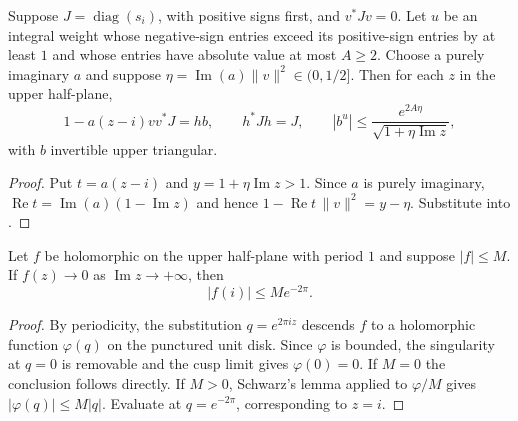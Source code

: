 \begin{lemma}
\label{lem:c-peak-triangular-upper}
\emitthmsource
Suppose $J=\operatorname{diag}(s_i)$, with positive signs first, and $v^*Jv=0$. Let $u$ be an integral weight whose negative-sign entries exceed its positive-sign entries by at least $1$ and whose entries have absolute value at most $A\ge2$. Choose a purely imaginary $a$ and suppose $\eta=\operatorname{Im}(a)\|v\|^2\in(0,1/2]$. Then for each $z$ in the upper half-plane,
\[
 1-a(z-i)v v^*J=hb,\qquad h^*Jh=J,\qquad
             |b^u|\le\frac{e^{2A\eta}}{\sqrt{1+\eta\operatorname{Im}z}},
\]
with $b$ invertible upper triangular.
\end{lemma}

\begin{proof}
Put $t=a(z-i)$ and $y=1+\eta\operatorname{Im}z>1$. Since $a$ is purely imaginary, $\operatorname{Re}t=\operatorname{Im}(a)(1-\operatorname{Im}z)$ and hence $1-\operatorname{Re}t\,\|v\|^2=y-\eta$. Substitute into .
\end{proof}

\begin{lemma}
\label{lem:c-peak-schwarz}
\emitthmsource
Let $f$ be holomorphic on the upper half-plane with period $1$ and suppose $|f|\le M$. If $f(z)\to0$ as $\operatorname{Im}z\to+\infty$, then
\[
                       |f(i)|\le M e^{-2\pi}.
\]
\end{lemma}

\begin{proof}
By periodicity, the substitution $q=e^{2\pi i z}$ descends $f$ to a holomorphic function $\varphi(q)$ on the punctured unit disk. Since $\varphi$ is bounded, the singularity at $q=0$ is removable and the cusp limit gives $\varphi(0)=0$. If $M=0$ the conclusion follows directly. If $M>0$, Schwarz's lemma applied to $\varphi/M$ gives $|\varphi(q)|\le M|q|$. Evaluate at $q=e^{-2\pi}$, corresponding to $z=i$.
\end{proof}

